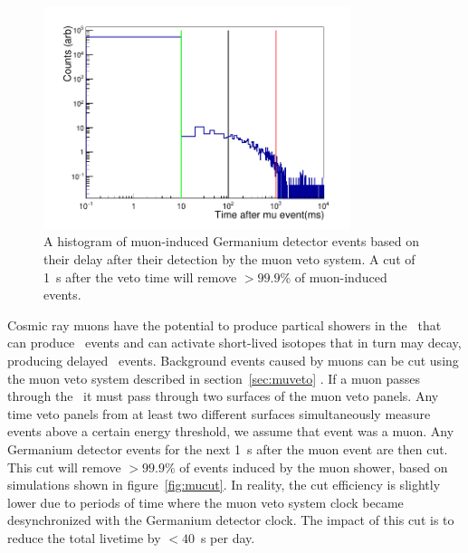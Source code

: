 \documentclass[/main.tex]{subfiles}
\begin{document}
\begin{figure}[ht]
  \centering
  \includegraphics[width=0.8\textwidth]{muvetoeff}
  \caption[Simulated efficiency of muon veto cut]{\label{fig:muvetoeff}
    A histogram of muon-induced Germanium detector events based on their delay after their detection by the muon veto system. A cut of 1~s after the veto time will remove $>99.9$\% of muon-induced events.\cite{2015wiseman}}
\end{figure}

Cosmic ray muons have the potential to produce partical showers in the \MJD\ that can produce \msmd\ events and can activate short-lived isotopes that in turn may decay, producing delayed \msmd\ events.
Background events caused by muons can be cut using the muon veto system described in section~\ref{sec:muveto} \cite{2015wiseman}.
If a muon passes through the \MJD\, it must pass through two surfaces of the muon veto panels.
Any time veto panels from at least two different surfaces simultaneously measure events above a certain energy threshold, we assume that event was a muon.
Any Germanium detector events for the next 1~s after the muon event are then cut.
This cut will remove $>99.9$\% of events induced by the muon shower, based on simulations shown in figure~\ref{fig:mucut}.
In reality, the cut efficiency is slightly lower due to periods of time where the muon veto system clock became desynchronized with the Germanium detector clock.
The impact of this cut is to reduce the total livetime by $<40$~s per day.
\\
\end{document}
